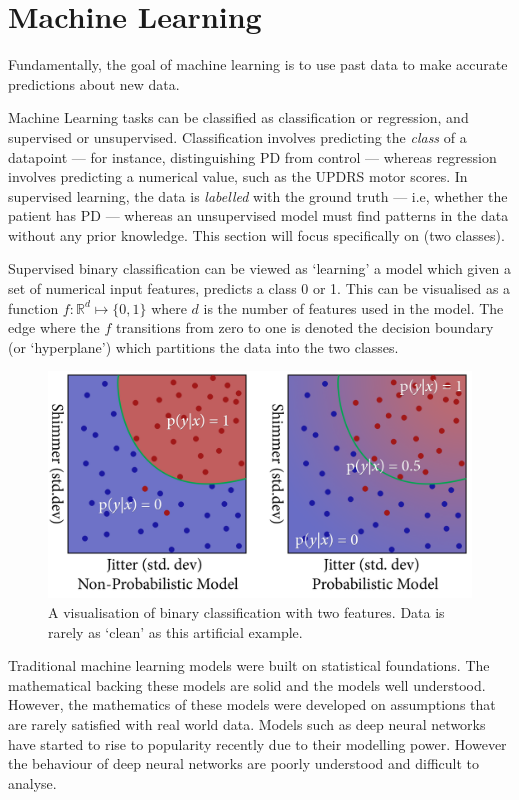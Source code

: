\documentclass[12pt, twoside]{book}
\renewcommand\emph[1]{\textit{\color{USred}{#1}}}
\begin{document}
\egroup
\section{Machine Learning}
\label{machinelearning}
\begin{highlight}
Fundamentally, the goal of machine learning is to use past data to make accurate predictions about new data. 
\end{highlight}

Machine Learning tasks can be classified as classification or regression, and supervised or unsupervised. Classification involves predicting the \textit{class} of a datapoint --- for instance, distinguishing PD from control --- whereas regression involves predicting a numerical value, such as the UPDRS motor scores. In supervised learning, the data is \textit{labelled} with the ground truth --- i.e, whether the patient has PD --- whereas an unsupervised model must find patterns in the data without any prior knowledge. This section will focus specifically on \emph{supervised binary classification} (two classes). 


Supervised binary classification can be viewed as `learning' a model which given a set of numerical input features, predicts a class 0 or 1. This can be visualised as a function $f : \mathbb{R}^d \mapsto \{0,1\}$ where $d$ is the number of features used in the model. The edge where the $f$ transitions from zero to one is denoted the decision boundary (or `hyperplane') which partitions the data into the two classes. 


\begin{figure}[h]
\label{binaryclass}
\centering\includegraphics[width=0.7\linewidth]{binaryclassification2.png}
\caption{A visualisation of binary classification with two features. Data is rarely as `clean' as this artificial example.}
\end{figure}

Traditional machine learning models were built on statistical foundations. The mathematical backing these models are solid and the models well understood. However, the mathematics of these models were developed on assumptions that are rarely satisfied with real world data. Models such as deep neural networks have started to rise to popularity recently due to their modelling power. However the behaviour of deep neural networks are poorly understood and difficult to analyse.    
\end{document}
